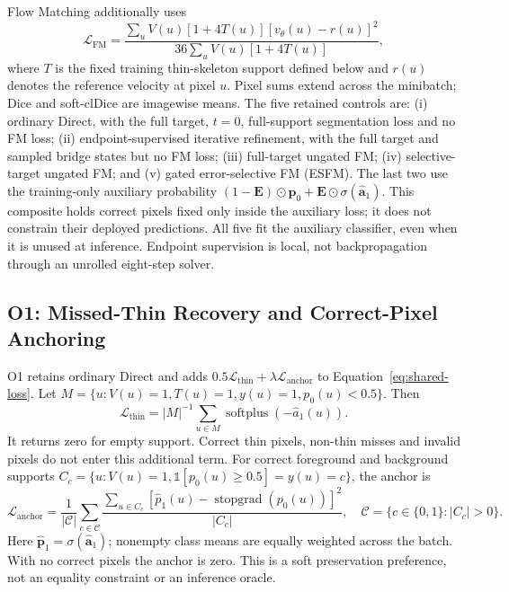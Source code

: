 \documentclass[jimaging,article,submit,pdftex,moreauthors]{Definitions/mdpi}
\begin{document}
Flow Matching additionally uses
\begin{equation}
\mathcal{L}_{\mathrm{FM}}=
\frac{\sum_u V(u)[1+4T(u)]
 [v_{\theta}(u)-r(u)]^2}
 {36\sum_u V(u)[1+4T(u)]},
\label{eq:fm-loss}
\end{equation}
where $T$ is the fixed training thin-skeleton support defined below and
$r(u)$ denotes the reference velocity at pixel $u$. Pixel sums extend across
the minibatch; Dice and soft-clDice are imagewise means.
The five retained controls are: (i) ordinary Direct, with the full target,
$t=0$, full-support segmentation loss and no FM loss; (ii) endpoint-supervised
iterative refinement, with the full target and sampled bridge states but no
FM loss; (iii) full-target ungated FM; (iv) selective-target ungated FM; and
(v) gated error-selective FM (ESFM). The last two use the training-only
auxiliary probability
$(1-\mathbf{E})\odot\mathbf{p}_0+
\mathbf{E}\odot\sigma(\widehat{\mathbf{a}}_1)$.
This composite holds correct pixels fixed only inside the auxiliary loss;
it does not constrain their deployed predictions. All five fit the auxiliary
classifier, even when it is unused at inference. Endpoint supervision is local,
not backpropagation through an unrolled eight-step solver.

\subsection{O1: Missed-Thin Recovery and Correct-Pixel Anchoring}
O1 retains ordinary Direct and adds
$0.5\mathcal{L}_{\mathrm{thin}}+
\lambda\mathcal{L}_{\mathrm{anchor}}$ to Equation~\eqref{eq:shared-loss}.
Let $M=\{u:V(u)=1,T(u)=1,y(u)=1,p_0(u)<0.5\}$. Then
\begin{equation}
\mathcal{L}_{\mathrm{thin}}=
 |M|^{-1}\sum_{u\in M}\operatorname{softplus}(-\widehat a_1(u)).
\end{equation}
It returns zero for empty support. Correct thin pixels, non-thin misses and
invalid pixels do not enter this additional term. For correct foreground and
background supports $C_c=\{u:V(u)=1,\mathbb{1}[p_0(u)\geq0.5]=y(u)=c\}$,
the anchor is
\begin{equation}
\mathcal{L}_{\mathrm{anchor}}=
\frac{1}{|\mathcal{C}|}\sum_{c\in\mathcal{C}}
\frac{\sum_{u\in C_c}[\widehat p_1(u)-\operatorname{stopgrad}(p_0(u))]^2}{|C_c|},
\quad \mathcal{C}=\{c\in\{0,1\}:|C_c|>0\}.
\label{eq:anchor}
\end{equation}
Here $\widehat{\mathbf{p}}_1=\sigma(\widehat{\mathbf{a}}_1)$; nonempty class
means are equally weighted across the batch. With no correct pixels the
anchor is zero. This is a soft preservation preference, not an equality
constraint or an inference oracle.
\end{document}
